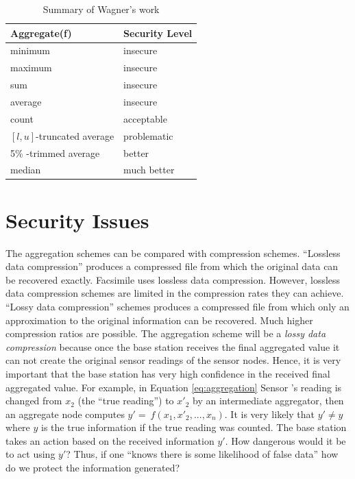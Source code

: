 	\begin{table}[!htb]	
		\begin{center}
			\begin{tabular}{ |l| l| }
				\hline
			    Aggregate(f) & Security Level \\
			    \hline
			    minimum & insecure \\
			    maximum & insecure \\
			    sum & insecure \\
				average & insecure \\
				count & acceptable \\
				$[l,u]$-truncated average & problematic \\
				5\% -trimmed average & better \\
				median & much better \\
			    \hline
			\end{tabular}
		\end{center}
		 \caption{Summary of Wagner's work}
		 \label{table:wagner}
	\end{table}

\section{Security Issues}
	\label{sec:security-issues}
	
	The aggregation schemes can be compared with compression schemes.
	``Lossless data compression'' \cite{alberto2000communication} produces a compressed file from which the original data can be recovered exactly.
	Facsimile uses lossless data compression.
	However, lossless data compression schemes are limited in the compression rates they can achieve.
	``Lossy data compression'' \cite{alberto2000communication} schemes produces a compressed file from which only an approximation to the original information can be recovered. Much higher compression ratios are possible.
	The aggregation scheme will be a \textit{lossy data compression} because once the base station receives the final aggregated value it can not create the original sensor readings of the sensor nodes.
	Hence, it is very important that the base station has very high confidence in the received final aggregated value. 
	For example, in Equation \ref{eq:aggregation} Sensor 's reading is changed from $x_{2}$ (the ``true reading'') to $x'_{2}$ by an intermediate aggregator, then an aggregate node computes $y' =\ f(x_{1},x'_{2},...,x_{n})$.
	It is very likely that $y' \neq y$ where $y$ is the true information if the true reading was counted.
	The base station takes an action based on the received information $y'$.
	How dangerous would it be to act using $y'$?
	Thus, if one ``knows there is some likelihood of false data'' how do we protect the information generated?


